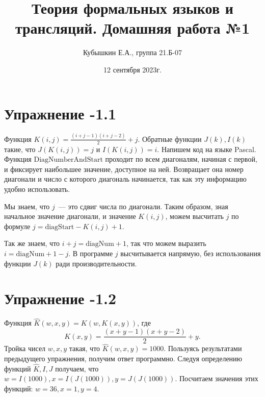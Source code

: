 \documentclass[12pt, a4paper, oneside]{memoir}
\title{Теория формальных языков и трансляций. Домашняя работа №1}
\author{Кубышкин Е.А., группа 21.Б-07}
\date{12 сентября 2023г.}
\begin{document}
\maketitle

\section*{Упражнение -1.1}
\begin{solution}
    {Функция $K(i, j) = \frac{(i+j-1)(i+j-2)}{2} + j.$}
    {Обратные функции $J(k), I(k)$ такие, что $J(K(i,j)) = j$ и $I(K(i, j)) = i$.}
    {Напишем код на языке Pascal.}
    Функция $\mathrm{DiagNumberAndStart}$ проходит по всем диагоналям, начиная с первой, и фиксирует наибольшее значение, доступное на ней. Возвращает она номер диагонали и число с которого диагональ начинается, так как эту информацию удобно использовать.

    Мы знаем, что $j$~--- это сдвиг числа по диагонали. Таким образом, зная начальное значение диагонали, и значение $K(i,j)$, можем высчитать $j$ по формуле $j = \mathrm{diagStart} - K(i,j) + 1$.

    Так же знаем, что $i + j = \mathrm{diagNum} + 1$, так что можем выразить $i = \mathrm{diagNum} + 1 - j$. В программе $j$ высчитывается напрямую, без использования функции $J(k)$ ради производительности.
    \newpage
    
\end{solution}
\section*{Упражнение -1.2}
\begin{solution}
    {Функция $\hat K(w, x, y) = K (w, K(x, y))$, где
        \begin{equation*}
            K(x, y) = \frac{(x+y-1)(x+y - 2)}{2} + y.
        \end{equation*}}
    {Тройка чисел $w, x, y$ такая, что $\hat K (w, x, y) = 1000$.}
    {Пользуясь результатами предыдущего упражнения, получим ответ программно.}
    Следуя определению функций $\hat K, I, J$ получаем, что $w = I(1000), x = I(J(1000)), y = J(J(1000))$. Посчитаем значения этих функций: $w = 36, x = 1, y = 4$.
\end{solution}
\end{document}
